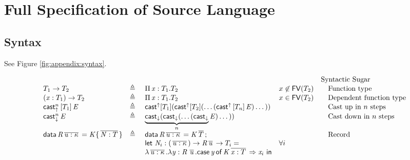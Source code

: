\section{Full Specification of Source Language}
\subsection{Syntax}
See Figure \ref{fig:appendix:syntax}.
\begin{figure*}
\centering
\gram{\ottpgm\ottinterrule
\ottdecl\ottinterrule
\ottu\ottinterrule
\ottp\ottinterrule
\ottE\ottinterrule
\ottV\ottinterrule
\ottGs}
    \[
    \begin{array}{lllll}
     &&&& \text{Syntactic Sugar} \\
     T_{{\mathrm{1}}}  \rightarrow  T_{{\mathrm{2}}} & \triangleq & \Pi \, \mathit{x}  :  T_{{\mathrm{1}}}  .  T_{{\mathrm{2}}} & x \not \in \mathsf{FV}(T_{{\mathrm{2}}}) &
\quad\text{Function type} \\
     (  \mathit{x}  :  T_{{\mathrm{1}}}  )  \rightarrow  T_{{\mathrm{2}}} & \triangleq & \Pi \, \mathit{x}  :  T_{{\mathrm{1}}}  .  T_{{\mathrm{2}}} & x \in \mathsf{FV}(T_{{\mathrm{2}}}) &
\quad\text{Dependent function type} \\
     \mathsf{cast}_{\uparrow}^n \, [  T_{{\mathrm{1}}}  ] \,  \mathit{E} &  \triangleq ~  &  \mathsf{cast}^{\uparrow}  [ T_{{\mathrm{1}}} ] ( \mathsf{cast}^{\uparrow}  [
T_{{\mathrm{2}}} ] (\dots ( \mathsf{cast}^{\uparrow} \, [  T_{\mathit{n}}  ] \,  \mathit{E} ) \dots )) &&
\quad\text{Cast up in $n$ steps} \\
     \mathsf{cast}_{\downarrow}^n \, \mathit{E} &  \triangleq ~  & \underbrace{ \mathsf{cast}_{\downarrow}  ( \mathsf{cast}_{\downarrow} 
(\dots (  \mathsf{cast}_{\downarrow} }_n \mathit{E}) \dots )) &&
\quad\text{Cast down in $n$ steps} \\
     \mathsf{data} \, \mathit{R}  \,\overline{  \mathit{u}  :  \kappa  }\,  =  \mathit{K}  \{  \,\overline{  \mathit{N}  :  T  }\,  \} & \triangleq &
                    \mathsf{data} \, \mathit{R}  \,\overline{  \mathit{u}  :  \kappa  }\,  =  \mathit{K}  \,\overline{  T  }\,; && \quad\text{Record} \\
                  &&  \mathsf{let} ~\mathit{N}_i : (  \,\overline{  \mathit{u}  :  \kappa  }\,  )  \rightarrow  \mathit{R}    \,\overline{  \mathit{u}  }\,  \rightarrow  T_i = &
\forall i &  \\
                  && \lambda  \,\overline{  \mathit{u}  :  \kappa  }\,  .  \lambda  \mathit{y}  :  \mathit{R} \, \,\overline{  \mathit{u}  }\,  .  \mathsf{case} \, \mathit{y} \, \mathsf{of} \, \mathit{K}  \,\overline{  \mathit{x}  :  T  }\,  \Rightarrow  \mathit{x}_i~ \mathsf{in}  && \\
    \end{array}
    \]
\caption{Syntax of source language}
\label{fig:appendix:syntax}
\end{figure*}

